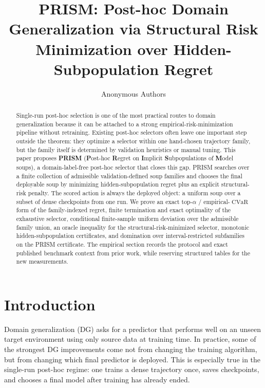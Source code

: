 \documentclass{article}
\title{PRISM: Post-hoc Domain Generalization via Structural Risk Minimization over Hidden-Subpopulation Regret}
\author{Anonymous Authors}
\newcommand{\CVaR}{\operatorname{CVaR}}
\newcommand{\prism}{\textup{\textsc{PRISM}}}
\newcommand{\1}{\mathbbm{1}}
\begin{document}
\maketitle

\begin{abstract}
Single-run post-hoc selection is one of the most practical routes to domain generalization because it can be attached to a strong empirical-risk-minimization pipeline without retraining. Existing post-hoc selectors often leave one important step outside the theorem: they optimize a selector within one hand-chosen trajectory family, but the family itself is determined by validation heuristics or manual tuning. This paper proposes \textbf{\prism{}} (\textbf{P}ost-hoc \textbf{R}egret on \textbf{I}mplicit \textbf{S}ubpopulations of \textbf{M}odel soups), a domain-label-free post-hoc selector that closes this gap. \prism{} searches over a finite collection of admissible validation-defined soup families and chooses the final deployable soup by minimizing hidden-subpopulation regret plus an explicit structural-risk penalty. The scored action is always the deployed object: a uniform soup over a subset of dense checkpoints from one run. We prove an exact top-$\alpha$ / empirical-\(\CVaR\) form of the family-indexed regret, finite termination and exact optimality of the exhaustive selector, conditional finite-sample uniform deviation over the admissible family union, an oracle inequality for the structural-risk-minimized selector, monotonic hidden-subpopulation certificates, and domination over interval-restricted subfamilies on the \prism{} certificate. The empirical section records the protocol and exact published benchmark context from prior work, while reserving structured tables for the new measurements.
\end{abstract}

\section{Introduction}

Domain generalization (DG) asks for a predictor that performs well on an unseen target environment using only source data at training time. In practice, some of the strongest DG improvements come not from changing the training algorithm, but from changing which final predictor is deployed. This is especially true in the single-run post-hoc regime: one trains a dense trajectory once, saves checkpoints, and chooses a final model after training has already ended.
\end{document}
